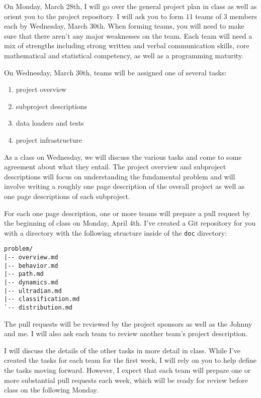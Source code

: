 \documentclass[11pt, oneside]{article}   	%
\begin{document}
On Monday, March 28th, I will go over the general project plan in class as well
as orient you to the project repository.  I will ask you to form 11 teams of 3
members each by Wednesday, March 30th.  When forming teams, you will need to
make sure that there aren't any major weaknesses on the team.  Each team will
need a mix of strengths including strong written and verbal communication
skills, core mathematical and statistical competency, as well as a programming
maturity.

On Wednesday, March 30th, teams will be assigned one of several tasks:

\begin{enumerate}

\item project overview

\item subproject descriptions

\item data loaders and tests

\item project infrastructure

\end{enumerate}

As a class on Wednesday, we will discuss the various tasks and come to some
agreement about what they entail.  The project overview and subproject
descriptions will focus on understanding the fundamental problem and will
involve writing a roughly one page description of the overall project as
well as one page descriptions of each subproject.

For each one page description, one or more teams will prepare a pull request by
the beginning of class on Monday, April 4th.  I've created a Git repository for
you with a directory with the following structure inside of the \texttt{doc}
directory:

\begin{verbatim}
problem/
|-- overview.md
|-- behavior.md
|-- path.md
|-- dynamics.md
|-- ultradian.md
|-- classification.md
`-- distribution.md
\end{verbatim}

The pull requests will be reviewed by the project sponsors as well as the
Johnny and me.  I will also ask each team to review another team's project
description.

I will discuss the details of the other tasks in more detail in class.  While
I've created the tasks for each team for the first week, I will rely on you
to help define the tasks moving forward.  However, I expect that each team
will prepare one or more substantial pull requests each week, which will be
ready for review before class on the following Monday.
\end{document}
